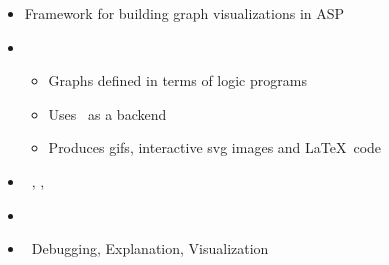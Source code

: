 \begin{frame}{\clingraph}
  \begin{itemize}
    \item {} Framework for building graph visualizations in ASP
    \item {}
      \begin{itemize}
      \item Graphs defined in terms of logic programs %
      \item Uses \graphviz\ as a backend
      \item Produces gifs, interactive svg images and \LaTeX\ code
      \end{itemize}
    \item {} \  \clingo, \clorm, \graphviz
    \item {} \ \cite{hasascst22a}
    \item {} \ Debugging, Explanation, Visualization %
  \end{itemize}
\end{frame}
%
